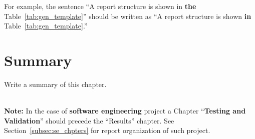 For example, the sentence ``A report structure is shown in
\textbf{the} Table~\ref{tab:gen_template}'' should be written as ``A
report structure is shown \textbf{in} Table~\ref{tab:gen_template}.''

\section{Summary}
Write a summary of this chapter.

~\\[5em]
\noindent
{\huge\textbf{Note:}} In the case of \textbf{software engineering}
project a Chapter ``\textbf{Testing and Validation}'' should precede
the ``Results'' chapter. See Section~\ref{subsec:se_chpters} for
report organization of such project.
